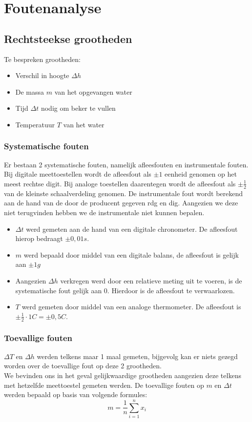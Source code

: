 \section{Foutenanalyse}

\subsection{Rechtsteekse grootheden}

Te bespreken grootheden:
\begin{itemize}
    \item Verschil in hoogte $\Delta h$
    \item De massa $m$ van het opgevangen water
    \item Tijd $\Delta t$ nodig om beker te vullen
    \item Temperatuur $T$ van het water
\end{itemize}

\subsubsection{Systematische fouten}
Er bestaan 2 systematische fouten, namelijk afleesfouten en instrumentale fouten. Bij digitale meettoestellen wordt de afleesfout als $\pm 1$ eenheid genomen op het meest rechtse digit. 
Bij analoge toestellen daarentegen wordt de afleesfout als $\pm \frac{1}{2}$ van de kleinste schaalverdeling genomen. De instrumentale fout wordt berekend aan de hand van de door de producent gegeven rdg en dig. Aangezien we deze niet terugvinden hebben we de instrumentale niet kunnen bepalen.
\begin{itemize}
    \item $\Delta t$ werd gemeten aan de hand van een digitale chronometer. De afleesfout hierop bedraagt $\pm 0,01 s$.
    \item $m$ werd bepaald door middel van een digitale balans, de afleesfout is gelijk aan $\pm 1g$
    \item Aangezien $\Delta h$ verkregen werd door een relatieve meting uit te voeren, is de systematische fout gelijk aan 0. Hierdoor is de afleesfout te verwaarlozen.
    \item $T$ werd gemeten door middel van een analoge thermometer. De afleesfout is $\pm \frac{1}{2} \cdot 1C = \pm 0,5C$.
\end{itemize} 



\subsubsection{Toevallige fouten}
$\Delta T$ en $\Delta h$ werden telkens maar 1 maal gemeten, bijgevolg kan er niets gezegd worden over de toevallige fout op deze 2 grootheden.
\\
We bevinden ons in het geval gelijkwaardige grootheden aangezien deze telkens met hetzelfde meettoestel gemeten werden.
De toevallige fouten op $m$ en $\Delta t$ werden bepaald op basis van volgende formules:
\begin{equation}
    m = \frac{1}{n} \sum\limits_{i=1}^n x_i
\end{equation}

